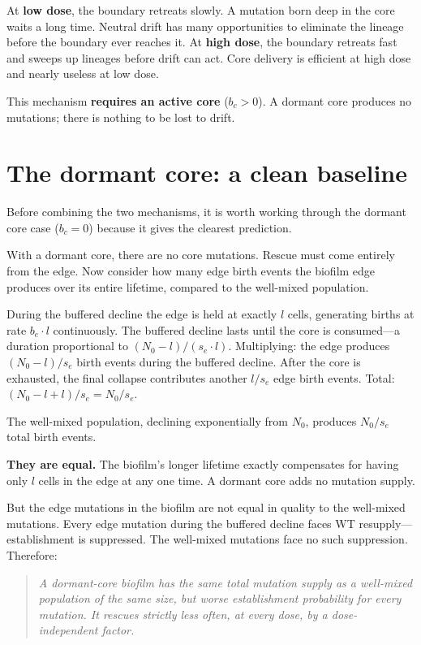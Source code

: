 \documentclass[12pt]{article}
\begin{document}
At \textbf{low dose}, the boundary retreats slowly. A mutation born deep in
the core waits a long time. Neutral drift has many opportunities to
eliminate the lineage before the boundary ever reaches it. At \textbf{high
dose}, the boundary retreats fast and sweeps up lineages before drift can
act. Core delivery is efficient at high dose and nearly useless at low dose.

This mechanism \textbf{requires an active core} ($b_c > 0$). A dormant core
produces no mutations; there is nothing to be lost to drift.

\section{The dormant core: a clean baseline}

Before combining the two mechanisms, it is worth working through the dormant
core case ($b_c = 0$) because it gives the clearest prediction.

With a dormant core, there are no core mutations. Rescue must come entirely
from the edge. Now consider how many edge birth events the biofilm edge
produces over its entire lifetime, compared to the well-mixed population.

During the buffered decline the edge is held at exactly $l$ cells,
generating births at rate $b_e \cdot l$ continuously. The buffered decline
lasts until the core is consumed---a duration proportional to $(N_0 -
l)/(s_e \cdot l)$. Multiplying: the edge produces $(N_0 - l)/s_e$ birth
events during the buffered decline. After the core is exhausted, the final
collapse contributes another $l/s_e$ edge birth events. Total:
$(N_0 - l + l)/s_e = N_0/s_e$.

The well-mixed population, declining exponentially from $N_0$, produces
$N_0/s_e$ total birth events.

\textbf{They are equal.} The biofilm's longer lifetime exactly compensates
for having only $l$ cells in the edge at any one time. A dormant core adds
no mutation supply.

But the edge mutations in the biofilm are not equal in quality to the
well-mixed mutations. Every edge mutation during the buffered decline faces
WT resupply---establishment is suppressed. The well-mixed mutations face
no such suppression. Therefore:

\begin{quote}
\textit{A dormant-core biofilm has the same total mutation supply as a
well-mixed population of the same size, but worse establishment probability
for every mutation. It rescues strictly less often, at every dose, by a
dose-independent factor.}
\end{quote}
\end{document}
